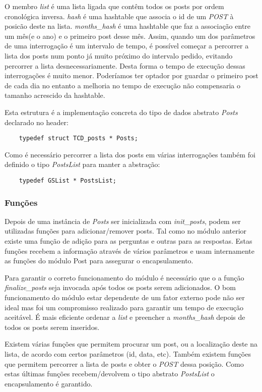\documentclass[10pt]{article}
\begin{document}
	O membro \emph{list} é uma lista ligada que contêm todos os posts por ordem cronológica inversa. \emph{hash} é uma hashtable que associa o id de um \emph{POST} à posicão deste na lista. \emph{months\_hash} é uma hashtable que faz a associação entre um mês(e o ano) e o primeiro post desse mês. Assim, quando um dos parâmetros de uma interrogação é um intervalo de tempo, é possível começar a percorrer a lista dos posts num ponto já muito próximo do intervalo pedido, evitando percorrer a lista desnecessariamente. Desta forma o tempo de execução dessas interrogações é muito menor. Poderíamos ter optador por guardar o primeiro post de cada dia no entanto a melhoria no tempo de execução não compensaria o tamanho acrescido da hashtable. 

	Esta estrutura é a implementação concreta do tipo de dados abstrato \emph{Posts} declarado no header:
	\begin{lstlisting} 
	typedef struct TCD_posts * Posts;
	\end{lstlisting}

	Como é necessário percorrer a lista dos posts em várias interrogações também foi definido o tipo \emph{PostsList} para manter a abstração:
	\begin{lstlisting} 
	typedef GSList * PostsList;
	\end{lstlisting}

\subsubsection{Funções}	
	
	Depois de uma instância de \emph{Posts} ser inicializada com \emph{init\_posts}, podem ser utilizadas funções para adicionar/remover posts. Tal como no módulo anterior existe uma função de adição para as perguntas e outras para as respostas. Estas funções recebem a informação através de vários parâmetros e usam internamente as funções do módulo Post para assegurar o encapsulamento.

	Para garantir o correto funcionamento do módulo é necessário que o a função \emph{finalize\_posts} seja invocada após todos os posts serem adicionados. O bom funcionamento do módulo estar dependente de um fator externo pode não ser ideal mas foi um compromisso realizado para garantir um tempo de execução aceitável. É mais eficiente ordenar a \emph{list} e preencher a \emph{months\_hash} depois de todos os posts serem inseridos.

	Existem várias funções que permitem procurar um post, ou a localização deste na lista, de acordo com certos parâmetros (id, data, etc). Também existem funções que permitem percorrer a lista de posts e obter o \emph{POST} dessa posição. Como estas últimas funções recebem/devolvem o tipo abstrato \emph{PostsList} o encapsulamento é garantido.
\end{document}

